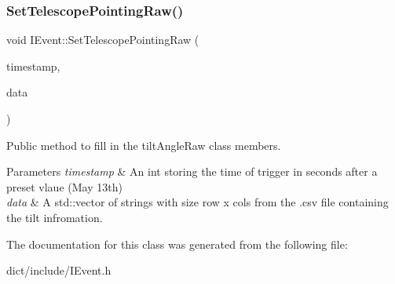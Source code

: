 \subsubsection{\texorpdfstring{Set\+Telescope\+Pointing\+Raw()}{SetTelescopePointingRaw()}}
{\footnotesize\ttfamily void I\+Event\+::\+Set\+Telescope\+Pointing\+Raw (\begin{DoxyParamCaption}\item[{int}]{timestamp,  }\item[{std\+::vector$<$ std\+::vector$<$ std\+::string $>$$>$}]{data }\end{DoxyParamCaption})}



Public method to fill in the tilt\+Angle\+Raw class members. 


\begin{DoxyParams}{Parameters}
{\em timestamp} & An int storing the time of trigger in seconds after a preset vlaue (May 13th) \\
\hline
{\em data} & A std\+::vector of strings with size row x cols from the .csv file containing the tilt infromation. \\
\hline
\end{DoxyParams}


The documentation for this class was generated from the following file\+:\begin{DoxyCompactItemize}
\item 
dict/include/I\+Event.\+h\end{DoxyCompactItemize}
